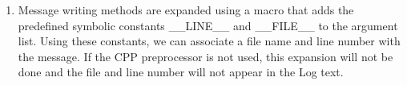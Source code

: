 %


\begin{enumerate}

\item Message writing methods are expanded using a macro that adds the
predefined symbolic constants \_\_LINE\_\_ and \_\_FILE\_\_ to the argument list.
Using these constants, we can associate a file name and line number with the
message.  If the CPP preprocessor is not used, this expansion will not be done
and the file and line number will not appear in the Log text.

\end{enumerate}
